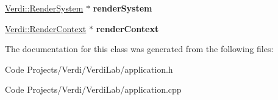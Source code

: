 \begin{DoxyCompactItemize}
\item 
\hypertarget{class_application_a613341f2116164c27b80602860022d60}{\hyperlink{class_verdi_1_1_render_system}{\-Verdi\-::\-Render\-System} $\ast$ {\bfseries render\-System}}\label{class_application_a613341f2116164c27b80602860022d60}

\item 
\hypertarget{class_application_ae49133da8bf35a6f7b1d5c4d22bac497}{\hyperlink{class_verdi_1_1_render_context}{\-Verdi\-::\-Render\-Context} $\ast$ {\bfseries render\-Context}}\label{class_application_ae49133da8bf35a6f7b1d5c4d22bac497}

\end{DoxyCompactItemize}


\-The documentation for this class was generated from the following files\-:\begin{DoxyCompactItemize}
\item 
\-Code Projects/\-Verdi/\-Verdi\-Lab/application.\-h\item 
\-Code Projects/\-Verdi/\-Verdi\-Lab/application.\-cpp\end{DoxyCompactItemize}
